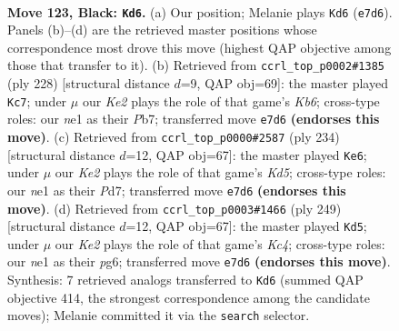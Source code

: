 \documentclass[11pt]{article}
\begin{document}
\clearpage

\begin{figure}[p]\centering
\begin{subfigure}{0.46\textwidth}\centering
\resizebox{\linewidth}{!}{%
\newchessgame
\chessboard[
  setfen={8/R3k3/8/5K2/6P1/8/8/1r2N3 b - - 30 123},
  showmover=false,
  pgfstyle=straightmove, color=movearrow, markmove={e7-d6}
]}
\caption{}
\end{subfigure}\hfill
\begin{subfigure}{0.46\textwidth}\centering
\resizebox{\linewidth}{!}{%
\newchessgame
\chessboard[
  setfen={8/1P3p2/1K2k3/8/8/3R4/1r6/8 w - - 9 115},
  showmover=false,
  pgfstyle=straightmove, color=movearrow, markmove={b6-c7}
]}
\caption{}
\end{subfigure}
\\[4pt]
\begin{subfigure}{0.46\textwidth}\centering
\resizebox{\linewidth}{!}{%
\newchessgame
\chessboard[
  setfen={8/3PR3/6kp/3K4/8/8/8/3r4 w - - 3 118},
  showmover=false,
  pgfstyle=straightmove, color=movearrow, markmove={d5-e6}
]}
\caption{}
\end{subfigure}\hfill
\begin{subfigure}{0.46\textwidth}\centering
\resizebox{\linewidth}{!}{%
\newchessgame
\chessboard[
  setfen={8/8/5KP1/2k1p3/8/8/6r1/2R5 b - - 3 125},
  showmover=false,
  pgfstyle=straightmove, color=movearrow, markmove={c5-d5}
]}
\caption{}
\end{subfigure}
\caption{\textbf{Move 123, Black: \texttt{Kd6}.} (a) Our position; Melanie plays \texttt{Kd6} (\texttt{e7d6}). Panels (b)--(d) are the retrieved master positions whose correspondence most drove this move (highest QAP objective among those that transfer to it). (b) Retrieved from \texttt{ccrl\_top\_p0002\#1385} (ply 228) [structural distance $d$=9, QAP obj=69]: the master played \texttt{Kc7}; under $\mu$ our \emph{Ke2} plays the role of that game's \emph{Kb6}; cross-type roles: our \emph{n}e1 as their \emph{P}b7; transferred move \texttt{e7d6} \textbf{(endorses this move)}. (c) Retrieved from \texttt{ccrl\_top\_p0000\#2587} (ply 234) [structural distance $d$=12, QAP obj=67]: the master played \texttt{Ke6}; under $\mu$ our \emph{Ke2} plays the role of that game's \emph{Kd5}; cross-type roles: our \emph{n}e1 as their \emph{P}d7; transferred move \texttt{e7d6} \textbf{(endorses this move)}. (d) Retrieved from \texttt{ccrl\_top\_p0003\#1466} (ply 249) [structural distance $d$=12, QAP obj=67]: the master played \texttt{Kd5}; under $\mu$ our \emph{Ke2} plays the role of that game's \emph{Kc4}; cross-type roles: our \emph{n}e1 as their \emph{p}g6; transferred move \texttt{e7d6} \textbf{(endorses this move)}. Synthesis: 7 retrieved analogs transferred to \texttt{Kd6} (summed QAP objective 414, the strongest correspondence among the candidate moves); Melanie committed it via the \texttt{search} selector.}
\label{fig:thought-m245}
\end{figure}
\end{document}
